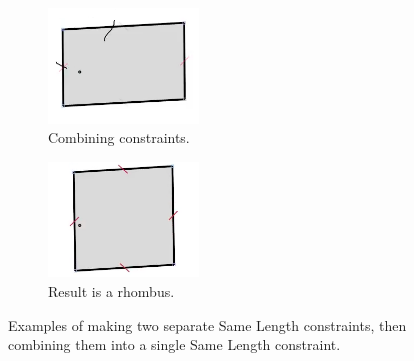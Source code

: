 \begin{figure}
  \vspace{5mm}
  \begin{subfigure}[t]{0.35\textwidth}
    \centering
    \includegraphics[width=40mm]{img/same-length-4.png}
    \caption{Combining constraints.}
    \label{fig:same-length-4}
  \end{subfigure}
  \hspace{1cm} %
  \begin{subfigure}[t]{0.35\textwidth}
    \centering
    \includegraphics[width=40mm]{img/same-length-5.png}
    \caption{Result is a rhombus.}
    \label{fig:same-length-5}
  \end{subfigure}

  \caption[Same Length Constraints]{Examples of making two separate
    Same Length constraints, then combining them into a single Same
    Length constraint.}
  \label{fig:same-length}
\end{figure}
